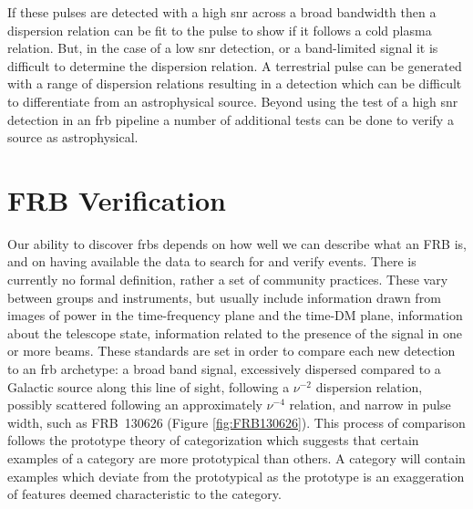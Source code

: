 \documentclass[a4paper,fleqn,usenatbib]{mnras}
\begin{document}
If these pulses are detected with a high \gls{snr} across a broad bandwidth then
a dispersion relation can be fit to the pulse to show if it follows a cold
plasma relation. But, in the case of a low \gls{snr} detection, or a
band-limited signal it is difficult to determine the dispersion relation. A
terrestrial pulse can be generated with a range of dispersion relations
resulting in a detection which can be difficult to differentiate from an
astrophysical source. Beyond using the test of a high \gls{snr} detection in an
\gls{frb} pipeline a number of additional tests can be done to verify a source
as astrophysical.

\section{FRB Verification}
\label{sec:verify_crit}

Our ability to discover \glspl{frb} depends on how well we can describe what an
FRB is, and on having available the data to search for and verify events. There
is currently no formal definition, rather a set of community practices. These
vary between groups and instruments, but usually include information drawn from
images of power in the time-frequency plane and the time-DM plane, information
about the telescope state, information related to the presence of the signal in
one or more beams.  These standards are set in order to compare each new
detection to an \gls{frb} archetype: a broad band signal, excessively dispersed
compared to a Galactic source along this line of sight, following a $\nu^{-2}$
dispersion relation, possibly scattered following an approximately $\nu^{-4}$
relation, and narrow in pulse width, such as FRB~130626
\citep{2016MNRAS.460L..30C} (Figure \ref{fig:FRB130626}). This process of
comparison follows the prototype theory of categorization \citep{ROSCH1976382}
which suggests that certain examples of a category are more prototypical than
others. A category will contain examples which deviate from the prototypical as
the prototype is an exaggeration of features deemed characteristic to the
category.
\end{document}
